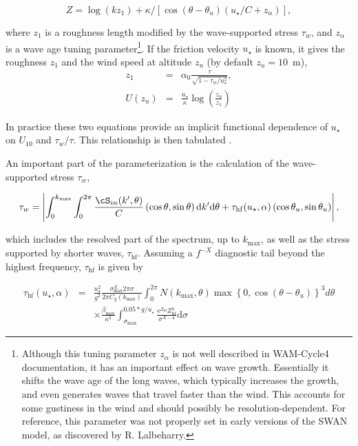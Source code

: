 \begin{equation}
Z=\log(k z_1)+\kappa/\left[\cos\left(\theta - \theta_u\right)
\left(u_\star/C + z_\alpha \right)\right],
\end{equation}

\noindent
where $z_1$ is a roughness length modified by the wave-supported stress
$\tau_w$, and $z_\alpha$ is a wave age tuning parameter\footnote{Although this
tuning parameter $z_\alpha$ is not well described in WAM-Cycle4 documentation,
it has an important effect on wave growth. Essentially it shifts the wave age
of the long waves, which typically increases the growth, and even generates
waves that travel faster than the wind. This accounts for some gustiness in
the wind and should possibly be resolution-dependent. For reference, this
parameter was not properly set in early versions of the SWAN model, as
discovered by R. Lalbeharry.}.  If the friction velocity $u_\star$ is known, 
it gives the roughness $z_1$ and the wind speed at altitude $z_u$ (by default $z_u=10$~m), 
\begin{eqnarray}
z_1&=&\alpha_0 \frac{\tau}{ \sqrt{1-\tau_w/u_\star^2}}, \\
U(z_u)&=&\frac{u_\star}{\kappa} \log\left(\frac{z_u}{z_1}\right)
\end{eqnarray}

\noindent
In practice these two equations provide an implicit functional dependence of
$u_\star$ on $U_{10}$ and $\tau_w/\tau$. This relationship is then tabulated
\citep{art:Jan91, rep:Bea07}.

An important part of the parameterization is the calculation of the
wave-supported stress $\tau_w$,

\begin{equation}
\tau_w=\left|\int_0^{k_{\max}} \int_0^{2 \pi} \frac{\cS_{in}(k',\theta)}{C}
\left(\cos \theta, \sin \theta \right)  {\mathrm d} k' \mathrm d \theta +
\tau_{\mathrm{hf}}(u_\star,\alpha) \left(\cos \theta_u, \sin \theta_u \right)
\right|,\label{eq:tauwint}
\end{equation}

\noindent
which includes the resolved part of the spectrum, up to $k_{\max}$, as well as
the stress supported by shorter waves, $\tau_{\mathrm{hf}}$. Assuming a
$f^{-X}$ diagnostic tail beyond the highest frequency, $\tau_{\mathrm{hf}}$ is
given by

\begin{eqnarray}
\tau_{\mathrm{hf}}(u_\star,\alpha)&= &\frac{u_{\star}^2}{g^2}
\frac{\sigma_{\max}^X 2 \pi \sigma }{2 \pi C_g(k_{\max})} \int_0^{2 \pi} N
\left(k_{\max},\theta \right)
\max\left\{0,\cos\left(\theta-\theta_u\right)\right\}^3 d \theta \nonumber \\
& & \times \frac{\beta_{\mathrm{max}}}{\kappa^2}
\int_{\sigma_{\max}}^{0.05*g/u_\star} \frac{{\mathrm
e}^{Z_{\mathrm{hf}}}Z_{\mathrm{hf}}^4}{\sigma^{X-4}} {\mathrm d} \sigma
\label{eq:tauhfint}
\end{eqnarray}

